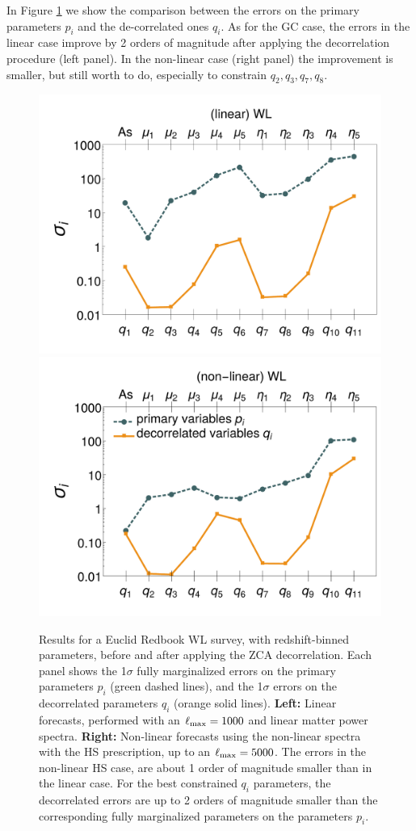 In Figure \ref{fig:WLbinerrs} we show the comparison between the errors on the primary
parameters $p_i$ and the de-correlated ones $q_i$. As for the GC case, the errors in the linear case improve by 2 orders of magnitude after applying the decorrelation procedure (left panel). In the non-linear case (right panel) the improvement is smaller, but still worth to do, especially to constrain $q_2,q_3,q_7,q_8$.

\begin{figure}[htbp]
	\centering{}\begin{center}
		\includegraphics[width=0.47\linewidth]{Chapters/linear-nonlinear-MG-forecasts/figures/Decorrelations-WL/Errors_at_par_index_i--_ZCA_SquareNorm--fiducialMGBin3_Euclid_WL_linearPK_}
		\includegraphics[width=0.47\linewidth]{Chapters/linear-nonlinear-MG-forecasts/figures/Decorrelations-WL/Errors_at_par_index_i--_ZCA_SquareNorm--fiducialMGBin3_Euclid_WL_nonlinearPk__Zhao_}
	\end{center}
	\caption[1$\sigma$ forecasted errors on the primary and decorrelated parameters for Euclid WL.]{\label{fig:WLbinerrs} 
	Results for a Euclid Redbook WL survey, with redshift-binned parameters, 
	before and after applying the ZCA decorrelation.
	Each panel shows the 1$\sigma$ fully marginalized errors on the primary parameters $p_i$ (green dashed
		lines), and the 1$\sigma$ errors on the decorrelated
		parameters $q_i$ (orange solid lines). \textbf{Left: }Linear forecasts,
		performed with an $\ell_{\rm max}=1000$ and linear matter power spectra.
		\textbf{Right: }Non-linear forecasts using the non-linear spectra with the HS prescription, up to an $\ell_{\rm max}=5000$.
		The errors in the non-linear HS case, are about 1 order of magnitude smaller than in the linear case. 
		For the best constrained $q_i$ parameters, the 
		decorrelated errors are up to 2 orders of magnitude smaller than the corresponding fully marginalized parameters on the parameters $p_i$.}
\end{figure}


